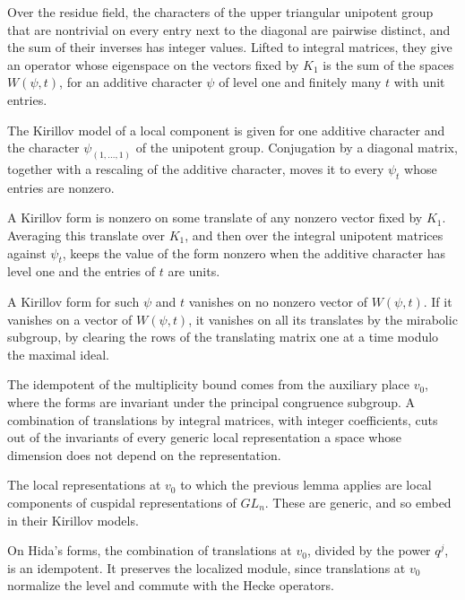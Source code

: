 Over the residue field, the characters of the upper triangular unipotent group that are nontrivial on every entry next to the diagonal are pairwise distinct, and the sum of their inverses has integer values. Lifted to integral matrices, they give an operator whose eigenspace on the vectors fixed by $K_1$ is the sum of the spaces $W(\psi,t)$, for an additive character $\psi$ of level one and finitely many $t$ with unit entries.

The Kirillov model of a local component is given for one additive character and the character $\psi_{(1,\dots,1)}$ of the unipotent group. Conjugation by a diagonal matrix, together with a rescaling of the additive character, moves it to every $\psi_t$ whose entries are nonzero.

A Kirillov form is nonzero on some translate of any nonzero vector fixed by $K_1$. Averaging this translate over $K_1$, and then over the integral unipotent matrices against $\psi_t$, keeps the value of the form nonzero when the additive character has level one and the entries of $t$ are units.

A Kirillov form for such $\psi$ and $t$ vanishes on no nonzero vector of $W(\psi,t)$. If it vanishes on a vector of $W(\psi,t)$, it vanishes on all its translates by the mirabolic subgroup, by clearing the rows of the translating matrix one at a time modulo the maximal ideal.

The idempotent of the multiplicity bound comes from the auxiliary place $v_0$, where the forms are invariant under the principal congruence subgroup. A combination of translations by integral matrices, with integer coefficients, cuts out of the invariants of every generic local representation a space whose dimension does not depend on the representation.

The local representations at $v_0$ to which the previous lemma applies are local components of cuspidal representations of $GL_n$. These are generic, and so embed in their Kirillov models.

On Hida's forms, the combination of translations at $v_0$, divided by the power $q^j$, is an idempotent. It preserves the localized module, since translations at $v_0$ normalize the level and commute with the Hecke operators.

